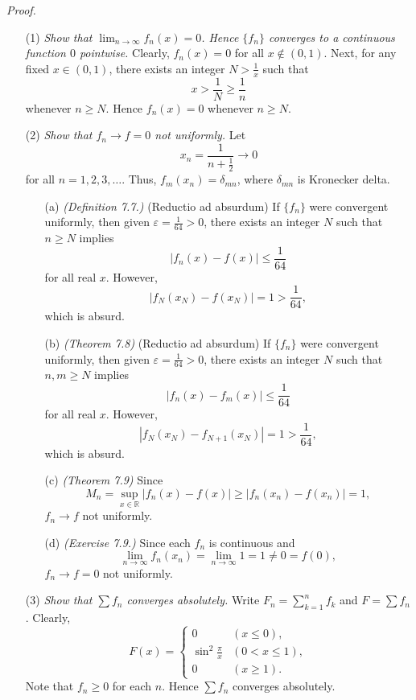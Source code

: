 \documentclass{article}
\begin{document}
\emph{Proof.}
\begin{enumerate}
\item[(1)]
\emph{Show that $\lim_{n \to \infty} f_n(x) = 0$.
Hence $\{f_n\}$ converges to a continuous function $0$ pointwise.}
Clearly, $f_n(x) = 0$ for all $x \not\in (0,1)$.
Next, for any fixed $x \in (0,1)$, there exists an integer $N > \frac{1}{x}$
such that
\[
  x > \frac{1}{N} \geq \frac{1}{n}
\]
whenever $n \geq N$.
Hence $f_n(x) = 0$ whenever $n \geq N$.

\item[(2)]
\emph{Show that $f_n \to f = 0$ not uniformly.}
Let
\[
  x_n = \frac{1}{n+\frac{1}{2}} \to 0
\]
for all $n=1,2,3,\ldots$.
Thus, $f_m(x_n) = \delta_{mn}$, where $\delta_{mn}$ is Kronecker delta.
  \begin{enumerate}
  \item[(a)]
  \emph{(Definition 7.7.)}
  (Reductio ad absurdum)
  If $\{f_n\}$ were convergent uniformly, then
  given $\varepsilon = \frac{1}{64} > 0$,
  there exists an integer $N$ such that $n \geq N$ implies
  \[
    |f_n(x) - f(x)| \leq \frac{1}{64}
  \]
  for all real $x$.
  However,
  \[
    |f_N(x_N) - f(x_N)| =  1 > \frac{1}{64},
  \]
  which is absurd.

  \item[(b)]
  \emph{(Theorem 7.8)}
  (Reductio ad absurdum)
  If $\{f_n\}$ were convergent uniformly, then
  given $\varepsilon = \frac{1}{64} > 0$,
  there exists an integer $N$ such that $n,m \geq N$ implies
  \[
    |f_n(x) - f_m(x)| \leq \frac{1}{64}
  \]
  for all real $x$.
  However,
  \[
    |f_N(x_{N}) - f_{N+1}(x_{N})| =  1 > \frac{1}{64},
  \]
  which is absurd.

  \item[(c)]
  \emph{(Theorem 7.9)}
  Since
  \[
    M_n
    = \sup_{x \in \mathbb{R}}|f_n(x) - f(x)|
    \geq |f_n(x_n) - f(x_n)| = 1,
  \]
  $f_n \to f$ not uniformly.

  \item[(d)]
  \emph{(Exercise 7.9.)}
  Since
  each $f_n$ is continuous and
  \[
    \lim_{n \to \infty} f_n(x_n) = \lim_{n \to \infty} 1 = 1 \neq 0 = f(0),
  \]
  $f_n \to f = 0$ not uniformly.
  \end{enumerate}

\item[(3)]
\emph{Show that $\sum f_n$ converges absolutely.}
Write $F_n = \sum_{k=1}^{n} f_k$ and $F = \sum f_n$.
Clearly,
\begin{equation*}
  F(x) =
    \begin{cases}
      0                    & (x \leq 0), \\
      \sin^2 \frac{\pi}{x} & (0 < x \leq 1), \\
      0                    & (x \geq 1).
    \end{cases}
\end{equation*}
Note that $f_n \geq 0$ for each $n$.
Hence $\sum f_n$ converges absolutely.


\end{enumerate}
\end{document}
